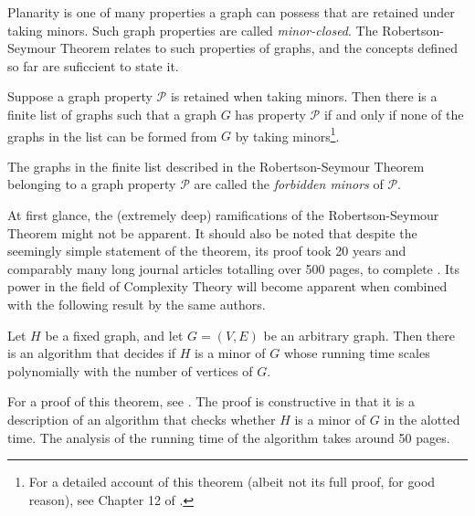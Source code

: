  Planarity is one of many properties a graph can possess that are retained under taking minors. Such graph properties are called \emph{minor-closed}. The Robertson-Seymour Theorem relates to such properties of graphs, and the concepts defined so far are suficcient to state it.

\begin{theorem}
Suppose a graph property $\mathcal{P}$ is retained when taking minors. Then there is a finite list of graphs such that a graph $G$ has property $\mathcal{P}$ if and only if none of the graphs in the list can be formed from $G$ by taking minors\footnote{For a detailed account of this theorem (albeit not its full proof, for good reason), see Chapter 12 of \cite{diestelGraphTheory2017}.}.
\end{theorem}

\begin{remark}
  The graphs in the finite list described in the Robertson-Seymour Theorem belonging to a graph property $\mathcal{P}$ are called the \emph{forbidden minors} of $\mathcal{P}$.
\end{remark}

At first glance, the (extremely deep) ramifications of the Robertson-Seymour Theorem might not be apparent. It should also be noted that despite the seemingly simple statement of the theorem, its proof took 20 years and comparably many long journal articles totalling over 500 pages, to complete \cite{RobertsonSeymourTheorem2020}. Its power in the field of Complexity Theory will become apparent when combined with the following result by the same authors.
\begin{theorem}
Let $H$ be a fixed graph, and let $G= (V, E)$ be an arbitrary graph. Then there is an algorithm that decides if $H$ is a minor of $G$ whose running time scales polynomially with the number of vertices of $G$.
\end{theorem}
For a proof of this theorem, see \cite{seymourGraphMinorsXIII1995}. The proof is constructive in that it is a description of an algorithm that checks whether $H$ is a minor of $G$ in the alotted time. The analysis of the running time of the algorithm takes around 50 pages.


